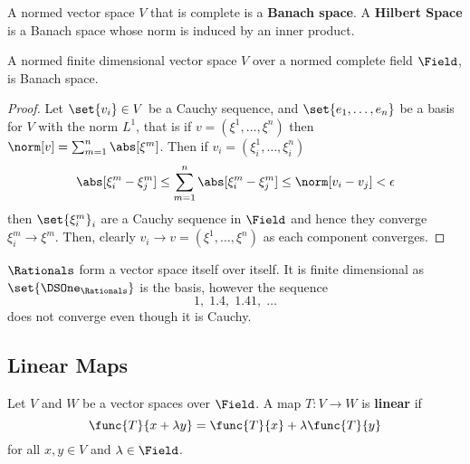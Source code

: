 \begin{definition}
    A normed vector space \(V\) that is complete is a \textbf{Banach space}. A \textbf{Hilbert Space} is a Banach space whose norm is induced by an inner product.
\end{definition}


\begin{proposition} \label{pr:FiniteIsBanach}
    A normed finite dimensional vector space \(V\) over a normed complete field \(\Field\), is Banach space.
\end{proposition}

\begin{proof}
    Let \(\set{v_i} \in V\) be a Cauchy sequence, and \(\set{e_1, \dots ,e_n}\) be a basis for \(V\) with the norm \(L^1\), that is if \(v = (\xi^1 , \dots ,\xi^n)\) then \(\norm[v] = \sum_{m = 1}^n \abs[\xi^m]\). Then if \(v_i = (\xi^1_i , \dots , \xi^n_i)\)
    \begin{equation*}
        \abs[\xi^m_i - \xi^m_j] \leq \sum_{m=1}^n \abs[\xi^m_i - \xi^m_j] \leq \norm[v_i - v_j] < \epsilon
    \end{equation*}
    then \(\set{\xi^m_i}_i\) are a Cauchy sequence in \(\Field\) and hence they converge \(\xi^m_i \to \xi^m\). Then, clearly \(v_i \to v = (\xi^1 , \dots , \xi^n)\) as each component converges.
\end{proof}

\begin{example}
    \(\Rationals\) form a vector space itself over itself. It is finite dimensional as \(\set{\DSOne_\Rationals}\) is the basis, however the sequence
    \begin{equation*}
        1 ,\; 1.4 ,\; 1.41 ,\; \dots
    \end{equation*}
    does not converge even though it is Cauchy.
\end{example}

\subsection{Linear Maps}
Let \(V\) and \(W\) be a vector spaces over \(\Field\). A map \(T: V \to W\) is \textbf{linear} if
\begin{equation*}
    \func{T}{x + \lambda y} = \func{T}{x} + \lambda \func{T}{y}
\end{equation*}
for all \(x,y \in V\) and \(\lambda \in \Field\).

